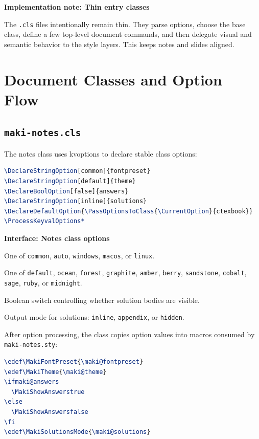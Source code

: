 \documentclass[a4paper,11pt]{ltxdoc}
\newcommand{\mfile}[1]{\texttt{#1}}
\newcommand{\mpkg}[1]{\textsf{#1}}
\newcommand{\mopt}[1]{\texttt{#1}}
\newenvironment{implementation}[1]
  {\par\medskip\noindent\textbf{\color{MakiBlue}Implementation note: #1}\par\smallskip}
  {\par\medskip}
\newenvironment{interfaceblock}[1]
  {\par\medskip\noindent\textbf{\color{MakiBlue}Interface: #1}\par\smallskip\begin{description}[leftmargin=3.2cm,style=nextline]}
  {\end{description}\par\medskip}
\begin{document}
\begin{implementation}{Thin entry classes}
The \mfile{.cls} files intentionally remain thin. They parse options, choose the
base class, define a few top-level document commands, and then delegate visual
and semantic behavior to the style layers. This keeps notes and slides aligned.
\end{implementation}

\section{Document Classes and Option Flow}

\subsection{\mfile{maki-notes.cls}}

The notes class uses \mpkg{kvoptions} to declare stable class options:

\begin{lstlisting}[language=TeX]
\DeclareStringOption[common]{fontpreset}
\DeclareStringOption[default]{theme}
\DeclareBoolOption[false]{answers}
\DeclareStringOption[inline]{solutions}
\DeclareDefaultOption{\PassOptionsToClass{\CurrentOption}{ctexbook}}
\ProcessKeyvalOptions*
\end{lstlisting}

\begin{interfaceblock}{Notes class options}
\item[\mopt{fontpreset}] One of \mopt{common}, \mopt{auto}, \mopt{windows}, \mopt{macos}, or \mopt{linux}.
\item[\mopt{theme}] One of \mopt{default}, \mopt{ocean}, \mopt{forest}, \mopt{graphite}, \mopt{amber}, \mopt{berry}, \mopt{sandstone}, \mopt{cobalt}, \mopt{sage}, \mopt{ruby}, or \mopt{midnight}.
\item[\mopt{answers}] Boolean switch controlling whether solution bodies are visible.
\item[\mopt{solutions}] Output mode for solutions: \mopt{inline}, \mopt{appendix}, or \mopt{hidden}.
\end{interfaceblock}

After option processing, the class copies option values into macros consumed by
\mfile{maki-notes.sty}:

\begin{lstlisting}[language=TeX]
\edef\MakiFontPreset{\maki@fontpreset}
\edef\MakiTheme{\maki@theme}
\ifmaki@answers
  \MakiShowAnswerstrue
\else
  \MakiShowAnswersfalse
\fi
\edef\MakiSolutionsMode{\maki@solutions}
\end{lstlisting}
\end{document}
